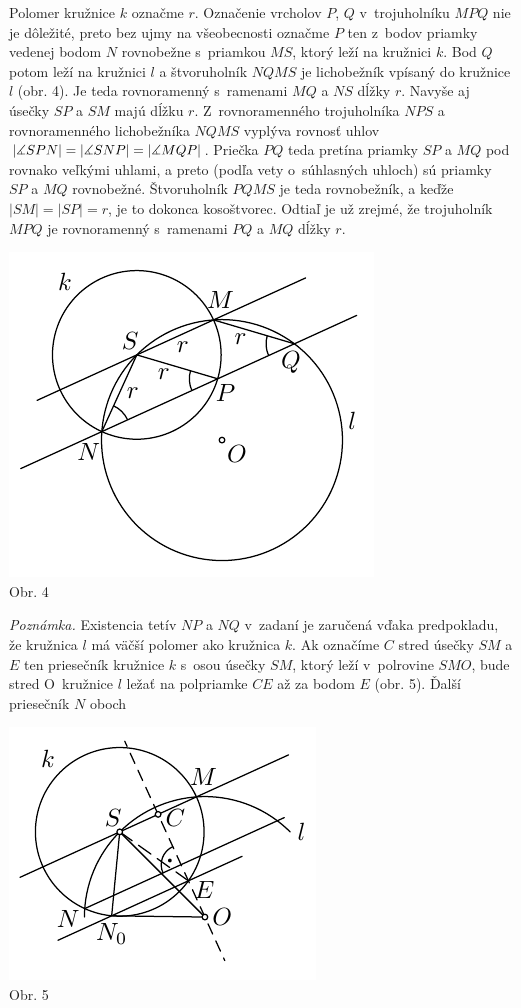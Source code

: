 \rieh Polomer kružnice $k$ označme $r$. Označenie vrcholov $P$, $Q$ v~trojuholníku $MPQ$ nie je dôležité, preto bez ujmy na všeobecnosti označme $P$ ten z~bodov priamky vedenej bodom $N$ rovnobežne s~priamkou $MS$, ktorý leží na kružnici $k$. Bod $Q$ potom leží na kružnici $l$ a štvoruholník $NQMS$ je lichobežník vpísaný do kružnice $l$ (obr. 4). Je teda rovnoramenný s~ramenami $MQ$ a $NS$ dĺžky $r$. Navyše aj úsečky $SP$ a $SM$ majú dĺžku $r$. Z~rovnoramenného trojuholníka $NPS$ a rovnoramenného lichobežníka $NQMS$ vyplýva rovnosť uhlov $|\measuredangle SPN| = |\measuredangle SNP| = |\measuredangle MQP|$. Priečka $PQ$ teda pretína priamky $SP$ a $MQ$ pod rovnako veľkými uhlami, a preto (podľa vety o~súhlasných uhloch) sú priamky $SP$ a $MQ$ rovnobežné. Štvoruholník $PQMS$ je teda rovnobežník, a keďže $|SM| = |SP| = r$, je to dokonca kosoštvorec. Odtiaľ je už zrejmé, že trojuholník $MPQ$ je rovnoramenný s~ramenami $PQ$ a $MQ$ dĺžky $r$.
\begin{center}
\includegraphics{obrazky/59K31}\\

Obr. 4
\end{center}
\textit{Poznámka.} Existencia tetív $NP$ a $NQ$ v~zadaní je zaručená vďaka predpokladu, že kružnica $l$ má väčší polomer ako kružnica $k$. Ak označíme $C$ stred úsečky $SM$ a $E$ ten priesečník kružnice $k$ s~osou úsečky $SM$, ktorý leží v~polrovine $SMO$, bude stred O~kružnice $l$ ležať na polpriamke $CE$ až za bodom $E$ (obr. 5). Ďalší priesečník $N$ oboch
\begin{center}
\includegraphics{obrazky/59K32}\\

Obr. 5
\end{center}
